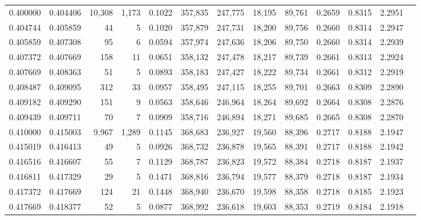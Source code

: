 \begin{tabular}{rrrrrrrrrrrrr}
0.400000 & 0.404406 & 10,308 & 1,173 &                                     0.1022 & 357,835 & 247,775 &  18,195 &  89,761 & 0.2659 & 0.8315 & 2.2951 \\
0.404744 & 0.405859 &     44 &     5 &                                     0.1020 & 357,879 & 247,731 &  18,200 &  89,756 & 0.2660 & 0.8314 & 2.2947 \\
0.405859 & 0.407308 &     95 &     6 &                                     0.0594 & 357,974 & 247,636 &  18,206 &  89,750 & 0.2660 & 0.8314 & 2.2939 \\
0.407372 & 0.407669 &    158 &    11 &                                     0.0651 & 358,132 & 247,478 &  18,217 &  89,739 & 0.2661 & 0.8313 & 2.2924 \\
0.407669 & 0.408363 &     51 &     5 &                                     0.0893 & 358,183 & 247,427 &  18,222 &  89,734 & 0.2661 & 0.8312 & 2.2919 \\
0.408487 & 0.409095 &    312 &    33 &                                     0.0957 & 358,495 & 247,115 &  18,255 &  89,701 & 0.2663 & 0.8309 & 2.2890 \\
0.409182 & 0.409290 &    151 &     9 &                                     0.0563 & 358,646 & 246,964 &  18,264 &  89,692 & 0.2664 & 0.8308 & 2.2876 \\
0.409439 & 0.409711 &     70 &     7 &                                     0.0909 & 358,716 & 246,894 &  18,271 &  89,685 & 0.2665 & 0.8308 & 2.2870 \\
0.410000 & 0.415003 &  9,967 & 1,289 &                                     0.1145 & 368,683 & 236,927 &  19,560 &  88,396 & 0.2717 & 0.8188 & 2.1947 \\
0.415019 & 0.416413 &     49 &     5 &                                     0.0926 & 368,732 & 236,878 &  19,565 &  88,391 & 0.2717 & 0.8188 & 2.1942 \\
0.416516 & 0.416607 &     55 &     7 &                                     0.1129 & 368,787 & 236,823 &  19,572 &  88,384 & 0.2718 & 0.8187 & 2.1937 \\
0.416811 & 0.417329 &     29 &     5 &                                     0.1471 & 368,816 & 236,794 &  19,577 &  88,379 & 0.2718 & 0.8187 & 2.1934 \\
0.417372 & 0.417669 &    124 &    21 &                                     0.1448 & 368,940 & 236,670 &  19,598 &  88,358 & 0.2718 & 0.8185 & 2.1923 \\
0.417669 & 0.418377 &     52 &     5 &                                     0.0877 & 368,992 & 236,618 &  19,603 &  88,353 & 0.2719 & 0.8184 & 2.1918 \\

\end{tabular}
